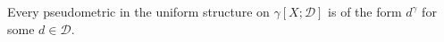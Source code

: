 Every pseudometric in the uniform structure on $\gamma[X; \mathcal{D}]$ is of the form $d^\gamma$ for some $d \in \mathcal{D}$.
